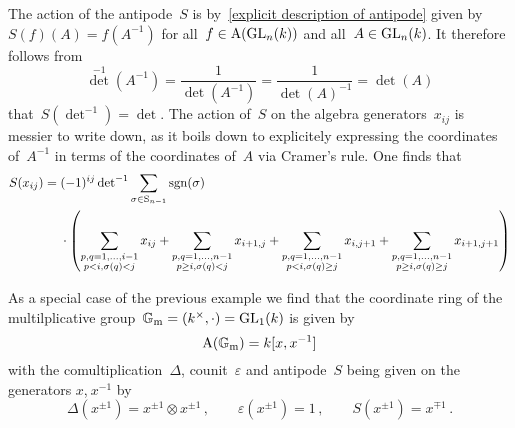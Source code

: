 \begin{example}
  The action of the antipode~$S$ is by~\eqref{explicit description of antipode} given by~$S(f)(A) = f(A^{-1})$ for all~$f \in \operatorname{A}(\operatorname{GL}_n(k))$ and all~$A \in \operatorname{GL}_n(k)$.
  It therefore follows from
  \[
      \det^{-1}\left( A^{-1} \right)
    = \frac{1}{\det(A^{-1})}
    = \frac{1}{\det(A)^{-1}}
    = \det(A)
  \]
  that~$S(\det^{-1}) = \det$.
  The action of~$S$ on the algebra generators~$x_{ij}$ is messier to write down, as it boils down to explicitely expressing the coordinates of~$A^{-1}$ in terms of the coordinates of~$A$ via Cramer’s rule.
  One finds that
  \begin{align*}
          S(x_{ij})
    ={}&  (-1)^{ij} \operatorname{det}^{-1}
          \sum_{\sigma \in \operatorname{S}_{n-1}}
          \operatorname{sgn}(\sigma)  \\
     {}&  {}\cdot
          \left(
            \sum_{\substack{p,q=1,\dotsc,i-1 \\ p < i, \sigma(q) < j}}
            x_{ij}
            +
            \sum_{\substack{p,q=1,\dotsc,n-1 \\ p \geq i, \sigma(q) < j}}
            x_{i+1,j}
            +
            \sum_{\substack{p,q=1,\dotsc,n-1 \\ p < i, \sigma(q) \geq j}}
            x_{i,j+1}
            +
            \sum_{\substack{p,q=1,\dotsc,n-1 \\ p \geq i, \sigma(q) \geq j}}
            x_{i+1,j+1}
          \right)
  \end{align*}
\end{example}


\begin{example}
  As a special case of the previous example we find that the coordinate ring of the multilplicative group~$\mathbb{G}_{\text{m}} = (k^\times, \cdot) = \operatorname{GL}_1(k)$ is given by
  \[
      \operatorname{A}(\mathbb{G}_{\text{m}})
    = k[x, x^{-1}]
  \]
  with the comultiplication~$\Delta$, counit~$\varepsilon$ and antipode~$S$ being given on the generators $x$,$~x^{-1}$ by
  \[
      \Delta\left( x^{\pm 1} \right)
    = x^{\pm 1} \otimes x^{\pm 1} \,,
    \qquad
      \varepsilon\left( x^{\pm 1} \right)
    = 1 \,,
    \qquad
      S\left( x^{\pm 1} \right)
    = x^{\mp 1} \,.
  \]
\end{example}




